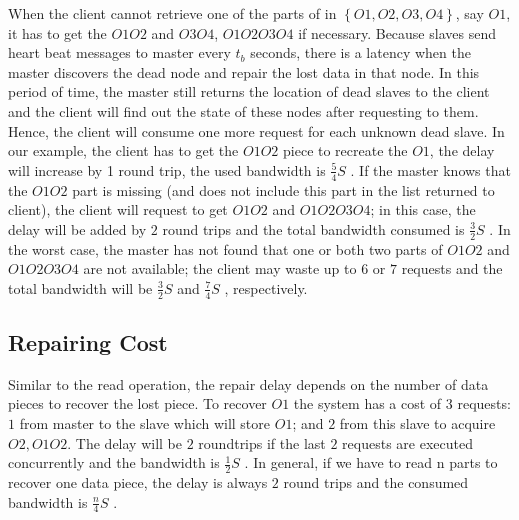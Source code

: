 \documentclass[conference]{IEEEtran}
\begin{document}
When the client cannot retrieve one of the parts of in $\left\{O1, O2, O3, O4\right\}$, say $O1$, it has to get the $O1O2$ and $O3O4$, $O1O2O3O4$ if necessary. Because slaves send heart beat messages to master every $t_b$ seconds, there is a latency when the master discovers the dead node and repair the lost data in that node. In this period of time, the master still returns the location of dead slaves to the client and the client will find out the state of these nodes after requesting to them. Hence, the client will consume one more request for each unknown dead slave. In our example, the client has to get the $O1O2$ piece to recreate the $O1$, the delay will increase by 1 round trip, the used bandwidth is $\frac{5}{4}S$ . If the master knows that the $O1O2$ part is missing (and does not include this part in the list returned to client), the client will request to get $O1O2$ and $O1O2O3O4$; in this case, the delay will be added by $2$ round trips and the total bandwidth consumed is $\frac{3}{2}S$ . In the worst case, the master has not found that one or both two parts of $O1O2$ and $O1O2O3O4$ are not available; the client may waste up to $6$ or $7$ requests and the total bandwidth will be $\frac{3}{2}S$  and $\frac{7}{4}S$ , respectively.



\subsection{Repairing Cost}
Similar to the read operation, the repair delay depends on the number of data pieces to recover the lost piece. To recover $O1$ the system has a cost of $3$ requests: $1$ from master to the slave which will store $O1$; and $2$ from this slave to acquire $O2, O1O2$. The delay will be $2$ roundtrips if the last $2$ requests are executed concurrently and the bandwidth is $\frac{1}{2}S$ . In general, if we have to read n parts to recover one data piece, the delay is always $2$ round trips and the consumed bandwidth is  $\frac{n}{4}S$ .
\end{document}
